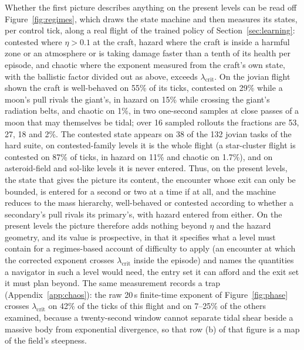 \documentclass[11pt]{article}
\begin{document}
Whether the first picture describes anything on the present levels can be
read off Figure~\ref{fig:regimes}, which draws the state machine and then
measures its states, per control tick, along a real flight of the trained
policy of Section~\ref{sec:learning}: contested where $\eta > 0.1$ at the
craft, hazard where the craft is inside a harmful zone or an atmosphere or
is taking damage faster than a tenth of its health per episode, and chaotic
where the exponent measured from the craft's own state, with the ballistic
factor divided out as above, exceeds $\lambda_{\mathrm{crit}}$. On the
jovian flight shown the craft is well-behaved on 55\% of its ticks,
contested on 29\% while a moon's pull rivals the giant's, in hazard on 15\%
while crossing the giant's radiation belts, and chaotic on 1\%, in two
one-second samples at close passes of a moon that may themselves be tidal;
over 16 sampled rollouts the fractions are 53, 27, 18 and 2\%. The
contested state appears on 38 of the 132 jovian tasks of the hard suite,
on contested-family levels it is the whole flight (a star-cluster flight is
contested on 87\% of ticks, in hazard on 11\% and chaotic on 1.7\%), and on
asteroid-field and sol-like levels it is never entered. Thus, on the
present levels, the state that gives the picture its content, the encounter
whose exit can only be bounded, is entered for a second or two at a time if
at all, and the machine reduces to the mass hierarchy, well-behaved or
contested according to whether a secondary's pull rivals its primary's,
with hazard entered from either. On the present levels the picture
therefore adds nothing beyond $\eta$ and the hazard geometry, and its value
is prospective, in that it specifies what a level must contain for a
regimes-based account of difficulty to apply (an encounter at which the
corrected exponent crosses $\lambda_{\mathrm{crit}}$ inside the episode)
and names the quantities a navigator in such a level would need, the entry
set it can afford and the exit set it must plan beyond. The same
measurement records a trap (Appendix~\ref{app:chaos}): the raw 20\,s
finite-time exponent of Figure~\ref{fig:phase} crosses
$\lambda_{\mathrm{crit}}$ on 42\% of the ticks of this flight and on
7--25\% of the others examined, because a twenty-second window cannot
separate tidal shear beside a massive body from exponential divergence, so
that row (b) of that figure is a map of the field's steepness.
\end{document}
